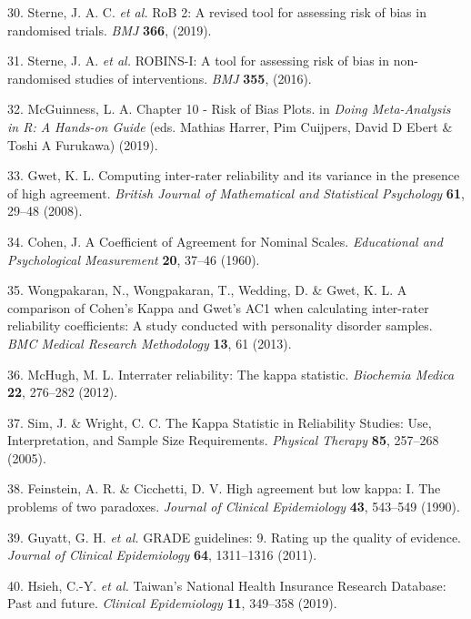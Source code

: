 \documentclass[a4paper, twoside]{templates/ociamthesis}
\begin{document}
\leavevmode\hypertarget{ref-sterne2019}{}%
30. Sterne, J. A. C. \emph{et al.} RoB 2: A revised tool for assessing risk of bias in randomised trials. \emph{BMJ} \textbf{366}, (2019).

\leavevmode\hypertarget{ref-sterne2016}{}%
31. Sterne, J. A. \emph{et al.} ROBINS-I: A tool for assessing risk of bias in non-randomised studies of interventions. \emph{BMJ} \textbf{355}, (2016).

\leavevmode\hypertarget{ref-mcguinness2019}{}%
32. McGuinness, L. A. Chapter 10 - Risk of Bias Plots. in \emph{Doing Meta-Analysis in R: A Hands-on Guide} (eds. Mathias Harrer, Pim Cuijpers, David D Ebert \& Toshi A Furukawa) (2019).

\leavevmode\hypertarget{ref-gwet2008}{}%
33. Gwet, K. L. Computing inter-rater reliability and its variance in the presence of high agreement. \emph{British Journal of Mathematical and Statistical Psychology} \textbf{61}, 29--48 (2008).

\leavevmode\hypertarget{ref-cohen1960}{}%
34. Cohen, J. A Coefficient of Agreement for Nominal Scales. \emph{Educational and Psychological Measurement} \textbf{20}, 37--46 (1960).

\leavevmode\hypertarget{ref-wongpakaran2013}{}%
35. Wongpakaran, N., Wongpakaran, T., Wedding, D. \& Gwet, K. L. A comparison of Cohen's Kappa and Gwet's AC1 when calculating inter-rater reliability coefficients: A study conducted with personality disorder samples. \emph{BMC Medical Research Methodology} \textbf{13}, 61 (2013).

\leavevmode\hypertarget{ref-mchugh2012}{}%
36. McHugh, M. L. Interrater reliability: The kappa statistic. \emph{Biochemia Medica} \textbf{22}, 276--282 (2012).

\leavevmode\hypertarget{ref-sim2005}{}%
37. Sim, J. \& Wright, C. C. The Kappa Statistic in Reliability Studies: Use, Interpretation, and Sample Size Requirements. \emph{Physical Therapy} \textbf{85}, 257--268 (2005).

\leavevmode\hypertarget{ref-feinstein1990}{}%
38. Feinstein, A. R. \& Cicchetti, D. V. High agreement but low kappa: I. The problems of two paradoxes. \emph{Journal of Clinical Epidemiology} \textbf{43}, 543--549 (1990).

\leavevmode\hypertarget{ref-guyatt2011}{}%
39. Guyatt, G. H. \emph{et al.} GRADE guidelines: 9. Rating up the quality of evidence. \emph{Journal of Clinical Epidemiology} \textbf{64}, 1311--1316 (2011).

\leavevmode\hypertarget{ref-hsieh2019}{}%
40. Hsieh, C.-Y. \emph{et al.} Taiwan's National Health Insurance Research Database: Past and future. \emph{Clinical Epidemiology} \textbf{11}, 349--358 (2019).
\end{document}
